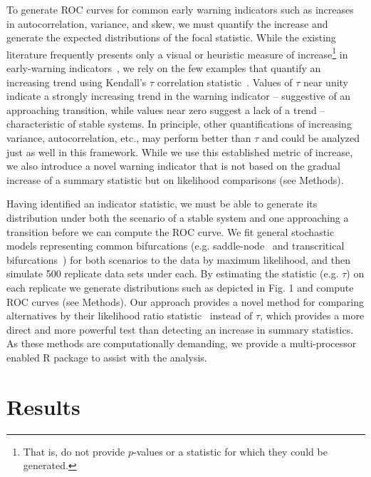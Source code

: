 \documentclass{pnastwo}
\begin{document}
\begin{article}
To generate ROC curves for common early warning indicators such as 
increases in autocorrelation, variance, and skew, 
we must quantify the increase and generate the expected distributions of the focal statistic.  
While the existing literature frequently presents only a 
visual or heuristic measure of increase\footnote{That is, do not provide $p$-values or a statistic for which they could be generated.} in early-warning indicators~\cite{Scheffer2009, Drake2010, Carpenter2011, Carpenter2006}, 
we rely on the few examples that quantify an increasing trend using Kendall's $\tau$ correlation statistic~\cite{Dakos2008, Dakos2011, Dakos2009}.
Values of $\tau$ near unity indicate a strongly increasing trend in the warning indicator --
suggestive of an approaching transition, while values near zero suggest a lack of a trend -- characteristic of stable systems.
In principle, other quantifications of increasing variance, autocorrelation, etc.,
may perform better than $\tau$ and could be analyzed just as well in this framework. 
While we use this established metric of increase, we also introduce a novel warning indicator
that is not based on the gradual increase of a summary statistic but on likelihood comparisons (see Methods).  

Having identified an indicator statistic,
we must be able to generate its distribution under both the scenario of a stable system and 
one approaching a transition before we can compute the ROC curve.
We fit general stochastic models representing common bifurcations
(e.g. saddle-node~\cite{Scheffer2009, Guttal2008a, VanNes2007, Biggs2009} and transcritical bifurcations~\cite{Drake2010})
for both scenarios to the data by maximum likelihood, and then simulate 500 replicate data sets under each⁠. 
By estimating the statistic (e.g. $\tau$) on each replicate we generate distributions such as depicted in Fig. 1 and compute ROC curves (see Methods).
Our approach provides a novel method for comparing alternatives by their likelihood ratio statistic~\cite{Cox1961}⁠ instead of $\tau$,
which provides a more direct and more powerful test than detecting an increase in summary statistics.
As these methods are computationally demanding, we provide a multi-processor enabled R package to assist with the analysis. 

\section{Results}


\end{article}
\end{document}
